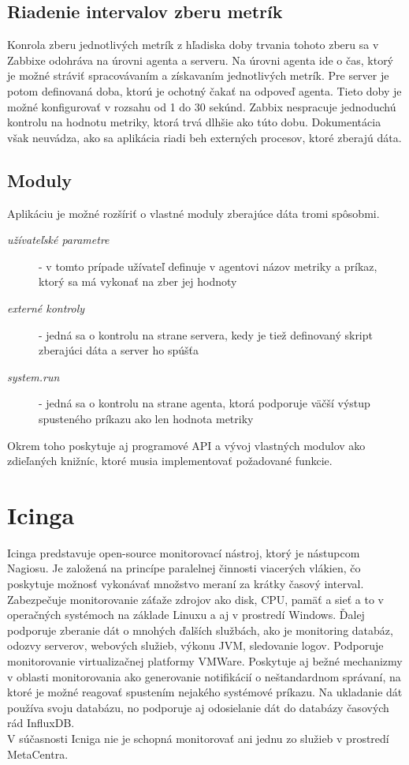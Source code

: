 \documentclass[11pt,final,oneside]{fithesis}
\begin{document}
\subsection{Riadenie intervalov zberu metrík}
Konrola zberu jednotlivých metrík z hľadiska doby trvania tohoto zberu sa v Zabbixe odohráva na úrovni agenta a serveru. Na úrovni agenta ide o čas, ktorý je možné stráviť spracovávaním a získavaním
jednotlivých metrík. Pre server je potom definovaná doba, ktorú je ochotný čakať na odpoveď agenta. Tieto doby je možné konfigurovať v rozsahu od 1 do 30 sekúnd.
\cite{20}
\cite{05}
Zabbix nespracuje jednoduchú kontrolu na hodnotu metriky, ktorá trvá dlhšie ako túto dobu.
\cite{04}
Dokumentácia však neuvádza, ako sa aplikácia riadi beh externých procesov, ktoré zberajú dáta.

\subsection{Moduly}
Aplikáciu je možné rozšíriť o vlastné moduly zberajúce dáta tromi spôsobmi. \cite{06}
\begin{description}
\item[\emph{užívateľské parametre}] - v tomto prípade užívateľ definuje v agentovi názov metriky a príkaz, ktorý sa má vykonať na zber jej hodnoty
\item[\emph{externé kontroly}] - jedná sa o kontrolu na strane servera, kedy je tiež definovaný skript zberajúci dáta a server ho spúšťa
\item[\emph{system.run}] - jedná sa o kontrolu na strane agenta, ktorá podporuje väčší výstup spusteného príkazu ako len hodnota metriky
\end{description}
Okrem toho poskytuje aj programové API a vývoj vlastných modulov ako zdieľaných knižníc, ktoré musia implementovať požadované funkcie.

\section{Icinga}
Icinga predstavuje open-source monitorovací nástroj, ktorý je nástupcom Nagiosu. Je založená na princípe paralelnej činnosti viacerých vlákien, čo poskytuje možnosť vykonávať množstvo meraní
za krátky časový interval. Zabezpečuje monitorovanie záťaže zdrojov ako disk, CPU, pamäť a sieť a to v operačných systémoch na základe Linuxu a aj v prostredí Windows. Ďalej podporuje zberanie
dát o mnohých ďalších službách, ako je monitoring databáz, odozvy serverov, webových služieb, výkonu JVM, sledovanie logov. Podporuje monitorovanie virtualizačnej platformy VMWare. 
Poskytuje aj bežné mechanizmy v oblasti monitorovania ako generovanie notifikácií o neštandardnom správaní, na ktoré je možné reagovať spustením nejakého systémové príkazu. Na ukladanie dát 
používa svoju databázu, no podporuje aj odosielanie dát do databázy časových rád InfluxDB.
\\V súčasnosti Icniga nie je schopná monitorovať ani jednu zo služieb v prostredí MetaCentra.
\end{document}
